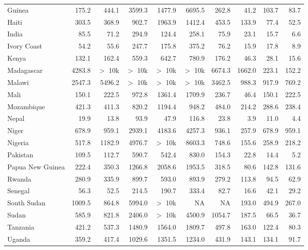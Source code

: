 \documentclass[12pt,english]{article}
\begin{document}
\begin{table}[b]
{\begin{tabular}[t]{lrrrrrrrrr}
            Guinea & 175.2 & 444.1 & 3599.3 & 1477.9 & 6695.5 & 262.8 & 41.2 & 103.7 & 83.7\\
            Haiti & 303.5 & 368.9 & 902.7 & 1963.9 & 1412.4 & 453.5 & 133.9 & 77.4 & 52.5\\
            India & 85.5 & 71.2 & 294.9 & 124.4 & 258.1 & 75.9 & 23.1 & 15.7 & 6.6\\
            Ivory Coast & 54.2 & 55.6 & 247.7 & 175.8 & 375.2 & 76.2 & 15.9 & 17.8 & 8.9\\
            Kenya & 132.1 & 162.4 & 559.3 & 642.7 & 780.9 & 176.2 & 46.3 & 28.1 & 15.6\\
            Madagascar & 4283.8 & $>$ 10k & $>$ 10k & $>$ 10k & $>$ 10k & 6674.3 & 1662.0 & 223.1 & 152.2\\
            Malawi & 2547.3 & 5496.2 & $>$ 10k & $>$ 10k & $>$ 10k & 3462.5 & 988.3 & 917.9 & 769.2\\
            Mali & 150.1 & 222.5 & 972.8 & 1361.4 & 1709.9 & 236.7 & 46.4 & 150.1 & 222.5\\
            Mozambique & 421.3 & 411.3 & 820.2 & 1194.4 & 948.2 & 484.0 & 214.2 & 288.6 & 238.4\\
            Nepal & 19.9 & 13.8 & 93.9 & 47.9 & 116.8 & 23.8 & 3.9 & 11.0 & 4.4\\
            Niger & 678.9 & 959.1 & 2939.1 & 4183.6 & 4257.3 & 936.1 & 257.9 & 678.9 & 959.1\\
            Nigeria & 517.8 & 1182.9 & 4976.7 & $>$ 10k & 8603.3 & 748.6 & 155.6 & 258.9 & 218.2\\
            Pakistan & 109.5 & 112.7 & 590.7 & 542.4 & 830.0 & 154.3 & 22.8 & 14.4 & 5.2\\
            Papua New Guinea & 222.4 & 350.3 & 1266.8 & 2058.6 & 1953.5 & 318.5 & 80.6 & 142.8 & 131.6\\
            Rwanda & 280.9 & 335.9 & 899.7 & 593.0 & 893.9 & 279.2 & 113.8 & 94.5 & 62.9\\
            Senegal & 56.3 & 52.5 & 214.5 & 190.7 & 333.4 & 82.7 & 16.6 & 42.1 & 29.2\\
            South Sudan & 1009.5 & 864.8 & 5994.0 & $>$ 10k & NA & NA & 193.0 & 494.9 & 267.0\\
            Sudan & 585.9 & 821.8 & 2406.0 & $>$ 10k & 4500.9 & 1054.7 & 187.5 & 66.5 & 36.7\\
            Tanzania & 421.2 & 537.3 & 1480.9 & 1564.0 & 1809.7 & 497.8 & 163.0 & 122.4 & 80.3\\
            Uganda & 359.2 & 417.4 & 1029.6 & 1351.5 & 1234.0 & 431.9 & 143.1 & 134.1 & 91.7\\

\end{tabular}}
\end{table}
\end{document}
